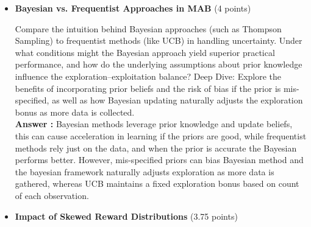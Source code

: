 \documentclass[12pt]{article}
\begin{document}
{{{\begin{itemize}[noitemsep]
    \vspace{0.25cm}
    In the Explore‑First agent (ExpFstAg), how does the choice of a fixed exploration period (e.g., 5 vs. 20 steps) affect the regret and performance variability? Provide a scenario in which a short exploration phase might yield unexpectedly high regret, and another scenario where a longer phase might delay exploitation unnecessarily.
    Deep Dive:
    Discuss how the “optimal” exploration duration can depend heavily on the underlying reward distribution’s variance and the gap between the best and other arms, and why a one‑size‑fits‑all approach may not work in practice.\\
    \textbf{Answer :} A short exploration phase might miss the best arm and results in high regret, while a long phase delays exploitation reduces short‑term rewards. The optimal duration depends on reward variance and arm gaps.
    In the environments with small differences between arms, too short exploration phase can lock in a suboptimal arm but in the cases that best arm is clear, extending exploration is unnecessary and increases regret by delaying exploitation.
    \vspace{0.5cm}
    \item \textbf{Bayesian vs. Frequentist Approaches in MAB} (4 points)
    
    \vspace{0.25cm}
    Compare the intuition behind Bayesian approaches (such as Thompson Sampling) to frequentist methods (like UCB) in handling uncertainty. Under what conditions might the Bayesian approach yield superior practical performance, and how do the underlying assumptions about prior knowledge influence the exploration–exploitation balance?
    Deep Dive:
    Explore the benefits of incorporating prior beliefs and the risk of bias if the prior is mis-specified, as well as how Bayesian updating naturally adjusts the exploration bonus as more data is collected.\\
    \textbf{Answer :} Bayesian methods leverage prior knowledge and update beliefs, this can cause acceleration in learning if the priors are good, while frequentist methods rely just on the data, and when the prior is accurate the Bayesian performs better.
    However, mis-specified priors can bias Bayesian method and the bayesian framework naturally adjusts exploration as more data is gathered, whereas UCB maintains a fixed exploration bonus based on count of each observation.
    \vspace{0.5cm}
    \item \textbf{Impact of Skewed Reward Distributions} (3.75 points)
    

\end{itemize}}}}
\end{document}
